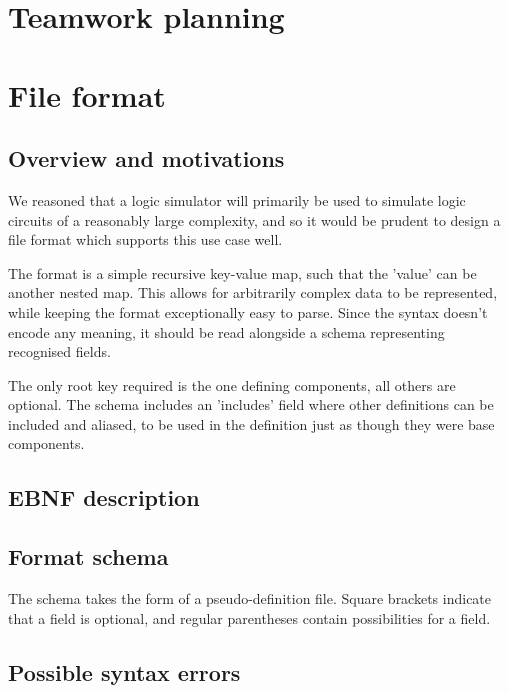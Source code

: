 \documentclass[a4paper]{article}
\begin{document}
\section{Teamwork planning}

\section{File format}
    \subsection{Overview and motivations}
        We reasoned that a logic simulator will primarily be used to simulate logic circuits of a reasonably large complexity, and so it would be prudent to design a file format which supports this use case well.

        The format is a simple recursive key-value map, such that the 'value' can be another nested map. This allows for arbitrarily complex data to be represented, while keeping the format exceptionally easy to parse. Since the syntax doesn't encode any meaning, it should be read alongside a schema representing recognised fields.

        The only root key required is the one defining components, all others are optional. The schema includes an 'includes' field where other definitions can be included and aliased, to be used in the definition just as though they were base components.

    \subsection{EBNF description}
    

    \subsection{Format schema}
    The schema takes the form of a pseudo-definition file. Square brackets indicate that a field is optional, and regular parentheses contain possibilities for a field.
    

    \subsection{Possible syntax errors}
\end{document}
